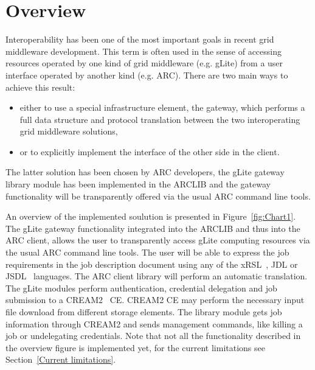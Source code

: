 \documentclass{article}
\begin{document}
\section{Overview}
\label{Overview}
Interoperability has been one of the most important goals in recent grid middleware development. This term is often used in the sense of accessing resources operated by one kind of grid middleware (e.g. gLite) from a user interface operated by another kind (e.g. ARC). There are two main ways to achieve this result:
\begin{itemize}
\item either to use a special infrastructure element, the gateway, which performs a full data structure and protocol translation between the two interoperating grid middleware solutions,
\item or to explicitly implement the interface of the other side in the client.
\end{itemize}
The latter solution has been chosen by ARC developers, the gLite gateway library module has been implemented in the ARCLIB and the gateway functionality will be transparently offered via the usual ARC command line tools.

An overview of the implemented soulution is presented in Figure~\ref{fig:Chart1}. The gLite gateway functionality integrated into the ARCLIB and thus into the ARC client, allows the user to transparently access gLite computing resources via the usual ARC command line tools. The user will be able to express the job requirements in the job description document using any of the xRSL~\cite{xrsl}, JDL or JSDL~\cite{jsdl} languages. The ARC client library will perform an automatic translation. The gLite modules perform authentication, credential delegation and job submission to a CREAM2~\cite{cream} CE. CREAM2 CE may perform the necessary input file download from different storage elements. The library module gets job information through CREAM2 and sends management commands, like killing a job or undelegating credentials. Note that not all the functionality described in the overview figure is implemented yet, for the current limitations see Section~\ref{Current limitations}.

\begin{figure}[ht]
\end{figure}
\end{document}
